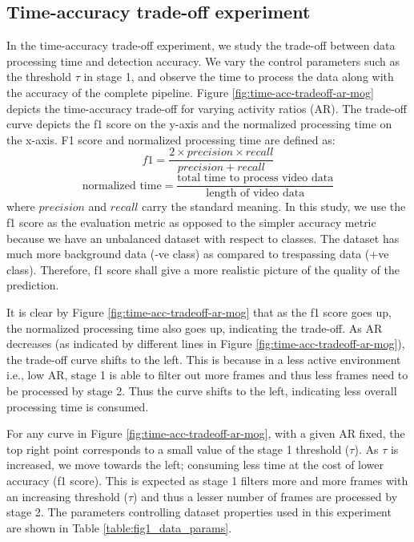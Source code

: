 \subsection{Time-accuracy trade-off experiment}
\label{sec:time-accuracy-trafe-off}
In the time-accuracy trade-off experiment, we study the trade-off  between data processing time and detection accuracy.
We vary the control parameters such as the threshold $\tau$ in stage 1, and observe the time to process the data along with the accuracy of the complete pipeline. Figure \ref{fig:time-acc-tradeoff-ar-mog} depicts the time-accuracy trade-off for varying activity ratios (AR). The trade-off curve depicts the f1 score on the y-axis and the normalized processing time on the x-axis. F1 score and normalized processing time are defined as: 
$$ f1 = \frac{2 \times precision \times recall}{precision + recall}$$
$$\text{normalized time} = \frac{\text{total time to process video data}}{\text{length of video data}}$$
where $precision$ and $recall$ carry the standard meaning. In this study, we use the f1 score as the evaluation metric as opposed to the simpler accuracy metric because we have an unbalanced dataset with respect to classes. The dataset has much more background data (-ve class) as compared to trespassing data (+ve class). Therefore, f1 score shall give a more realistic picture of the quality of the prediction. 

It is clear by Figure \ref{fig:time-acc-tradeoff-ar-mog} that as the f1 score goes up, the normalized processing time also goes up, indicating the trade-off. As AR decreases (as indicated by different lines in Figure \ref{fig:time-acc-tradeoff-ar-mog}), the trade-off curve shifts to the left. This is because in a less active environment i.e., low AR, stage 1 is able to filter out more frames and thus less frames need to be processed by stage 2. Thus the curve shifts to the left, indicating less overall processing time is consumed.   

For any curve in Figure \ref{fig:time-acc-tradeoff-ar-mog}, with a given AR fixed, the top right point corresponds to a small value of the stage 1 threshold ($\tau$). As $\tau$ is increased, we move towards the left; consuming less time at the cost of lower accuracy (f1 score). This is expected as stage 1 filters more and more frames with an increasing threshold ($\tau$) and thus a lesser number of frames are processed by stage 2. The parameters controlling dataset properties used in this experiment are shown in Table \ref{table:fig1_data_params}. 

